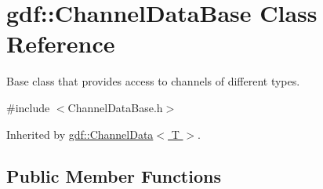 \hypertarget{classgdf_1_1_channel_data_base}{
\section{gdf::ChannelDataBase Class Reference}
\label{classgdf_1_1_channel_data_base}
}


Base class that provides access to channels of different types.  




{\ttfamily \#include $<$ChannelDataBase.h$>$}



Inherited by \hyperlink{classgdf_1_1_channel_data}{gdf::ChannelData$<$ T $>$}.

\subsection*{Public Member Functions}
